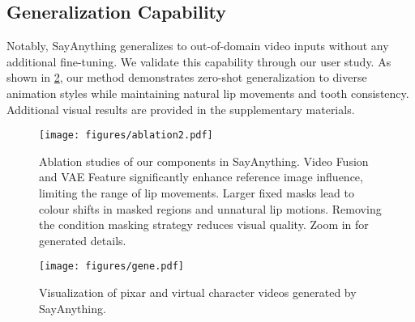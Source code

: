 \subsection{Generalization Capability}

Notably, SayAnything generalizes to out-of-domain video inputs without any additional fine-tuning. We validate this capability through our user study. As shown in \cref{fig:gen}, our method demonstrates zero-shot generalization to diverse animation styles while maintaining natural lip movements and tooth consistency. Additional visual results are provided in the supplementary materials.




\begin{figure}[!ht]
    \centering
    \texttt{[image: figures/ablation2.pdf]}
    
    \caption{Ablation studies of our components in SayAnything. Video Fusion and VAE Feature significantly enhance reference image influence, limiting the range of lip movements. Larger fixed masks lead to colour shifts in masked regions and unnatural lip motions. Removing the condition masking strategy reduces visual quality. Zoom in for generated details.}
        
    \label{fig:ablastudy}
\end{figure}

\begin{figure}[!htp]
    \centering
    \setlength{\abovecaptionskip}{0.cm}
    \setlength{\belowcaptionskip}{0.cm}
    \texttt{[image: figures/gene.pdf]}
    \caption{Visualization of pixar and virtual character videos generated by SayAnything.}
    \label{fig:gen}
\end{figure}

